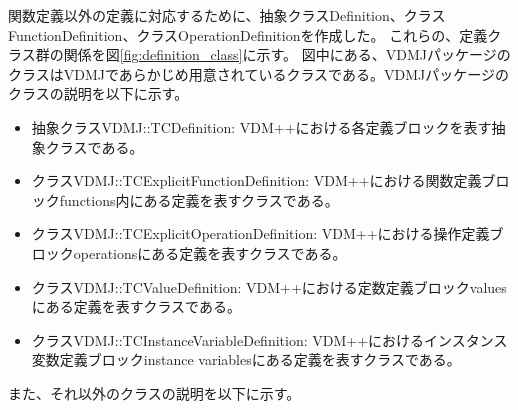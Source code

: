 \documentclass[uplatex, report, a4j, 10pt]{jsbook}
\begin{document}
関数定義以外の定義に対応するために、抽象クラスDefinition、クラスFunctionDefinition、クラスOperationDefinitionを作成した。
これらの、定義クラス群の関係を図\ref{fig:definition_class}に示す。
図中にある、VDMJパッケージのクラスはVDMJであらかじめ用意されているクラスである。VDMJパッケージのクラスの説明を以下に示す。

\begin{itemize}
  \item 抽象クラスVDMJ::TCDefinition: VDM++における各定義ブロックを表す抽象クラスである。
  \item クラスVDMJ::TCExplicitFunctionDefinition: VDM++における関数定義ブロックfunctions内にある定義を表すクラスである。
  \item クラスVDMJ::TCExplicitOperationDefinition: VDM++における操作定義ブロックoperationsにある定義を表すクラスである。
  \item クラスVDMJ::TCValueDefinition: VDM++における定数定義ブロックvaluesにある定義を表すクラスである。
  \item クラスVDMJ::TCInstanceVariableDefinition: VDM++におけるインスタンス変数定義ブロックinstance variablesにある定義を表すクラスである。
\end{itemize}

また、それ以外のクラスの説明を以下に示す。
\end{document}
